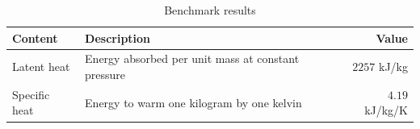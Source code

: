 \documentclass{article}
\begin{document}
\begin{table}[h]
\centering
\caption{Benchmark results}
\begin{tabularx}{\linewidth}{l X r}
\textbf{Content} & \textbf{Description} & \textbf{Value} \\
\hline
Latent heat    & Energy absorbed per unit mass at constant pressure & $2257$ kJ/kg \\
Specific heat  & Energy to warm one kilogram by one kelvin & $4.19$ kJ/kg/K \\
\end{tabularx}
\end{table}
\end{document}
